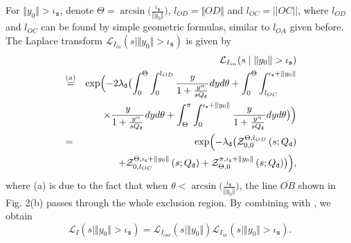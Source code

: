 \documentclass[twocolumn,english]{IEEEtran}
\theoremstyle{plain}
\theoremstyle{definition}
\begin{document}
For $\Vert y_{0}\Vert>\iota_{\mathtt{s}}$, denote $\Theta=\arcsin\bigl(\frac{\iota_{\mathtt{s}}}{\Vert y_{0}\Vert}\bigr)$,
$l_{OD}=\Vert OD\Vert$ and $l_{OC}=||OC||$, where $l_{OD}$ and
$l_{OC}$ can be found by simple geometric formulas, similar to $l_{OA}$
given before. The Laplace transform $\mathcal{L}_{I_{in}}(s\mid\Vert y_{0}\Vert>\iota_{\mathtt{s}})$
is given by
\begin{eqnarray}
 &  & \mathcal{L}_{I_{in}}(s\mid\Vert y_{0}\Vert>\iota_{\mathtt{s}})\nonumber \\
 & \overset{(a)}{=} & \exp\Bigl(-2\lambda_{\mathtt{d}}\bigl(\int_{0}^{\Theta}\int_{0}^{l_{OD}}\frac{y}{1+\frac{y^{\alpha}}{sQ_{\mathtt{d}}}}dyd\theta+\int_{0}^{\Theta}\int_{l_{OC}}^{\iota_{\mathtt{s}}+\Vert y_{0}\Vert}\nonumber \\
 &  & \times\frac{y}{1+\frac{y^{\alpha}}{sQ_{\mathtt{d}}}}dyd\theta+\int_{\Theta}^{\pi}\int_{0}^{\iota_{\mathtt{s}}+\Vert y_{0}\Vert}\frac{y}{1+\frac{y^{\alpha}}{sQ_{\mathtt{d}}}}dyd\theta\bigr)\Bigr)\nonumber \\
 & = & \exp\Bigl(-\lambda_{\mathtt{d}}\bigl(\mathcal{Z}_{0,0}^{\Theta,l_{OD}}\left(s;Q_{\mathtt{d}}\right)\nonumber \\
 &  & +\mathcal{Z}_{0,l_{OC}}^{\Theta,\iota_{\mathtt{s}}+\Vert y_{0}\Vert}\left(s;Q_{\mathtt{d}}\right)+\mathcal{Z}_{\Theta,0}^{\pi,\iota_{\mathtt{s}}+\Vert y_{0}\Vert}\left(s;Q_{\mathtt{d}}\right)\bigr)\Bigr),\label{eq:I_in_1}
\end{eqnarray}
where (a) is due to the fact that when $\theta<\arcsin\bigl(\frac{\iota_{\mathtt{s}}}{\Vert y_{0}\Vert}\bigr)$,
the line $\overline{OB}$ shown in Fig. 2(b) passes through the whole
exclusion region. By combining  with ,
we obtain
\begin{equation}
\mathcal{L}_{I}(s\mid\Vert y_{0}\Vert>\iota_{\mathtt{s}})=\mathcal{L}_{I_{out}}(s\mid\Vert y_{0}\Vert)\mathcal{L}_{I_{in}}(s\mid\Vert y_{0}\Vert>\iota_{\mathtt{s}}).
\end{equation}
\end{document}
